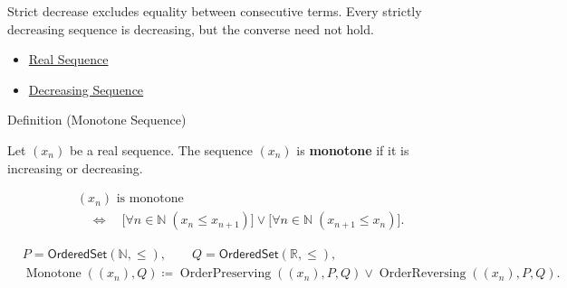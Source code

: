 \begin{remark*}[Interpretation]
Strict decrease excludes equality between consecutive terms. Every strictly
decreasing sequence is decreasing, but the converse need not hold.
\end{remark*}

\begin{dependencies}
\begin{itemize}
  \item \hyperref[def:real-sequence]{Real Sequence}
  \item \hyperref[def:decreasing-sequence]{Decreasing Sequence}
\end{itemize}
\end{dependencies}


\begin{definitionbox}{Definition (Monotone Sequence)}
\begin{definition}
\label{def:monotone-sequence}
Let $(x_n)$ be a real sequence. The sequence $(x_n)$ is
\textbf{monotone} if it is increasing or decreasing.
\end{definition}
\end{definitionbox}

\begin{remark*}
\[
\begin{aligned}
&(x_n)\text{ is monotone}\\
&\quad\Longleftrightarrow\quad
\bigl[\forall n\in\mathbb{N}\;(x_n\le x_{n+1})\bigr]
\lor
\bigl[\forall n\in\mathbb{N}\;(x_{n+1}\le x_n)\bigr].
\end{aligned}
\]
\end{remark*}

\begin{remark*}
\[
\begin{aligned}
&P=\mathsf{OrderedSet}(\mathbb{N},\leq),\qquad
Q=\mathsf{OrderedSet}(\mathbb{R},\leq),\\
&\operatorname{Monotone}((x_n),Q)
\coloneqq
\operatorname{OrderPreserving}((x_n),P,Q)
\lor
\operatorname{OrderReversing}((x_n),P,Q).
\end{aligned}
\]
\end{remark*}

